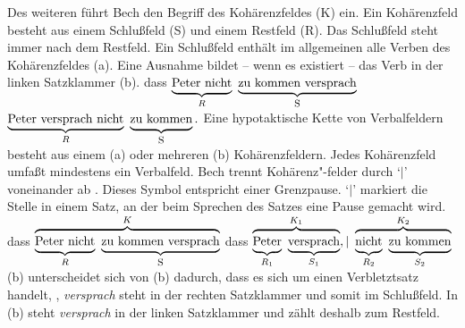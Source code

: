 Des weiteren führt Bech den Begriff des Kohärenzfeldes (K) ein.%
Ein Kohärenzfeld besteht aus einem Schlußfeld (S) und einem Restfeld (R).%
%
%
%
Das Schlußfeld steht immer nach dem Restfeld. Ein Schlußfeld enthält im allgemeinen
alle Verben des Kohärenzfeldes (a). Eine Ausnahme bildet -- wenn es existiert --
das Verb in der linken Satzklammer (b).
\eal
\ex dass ${\underbrace{\rule[-0.5ex]{0cm}{2.5ex}\mbox{Peter nicht}
                              }_{R}~
                   \underbrace{\mbox{zu kommen versprach}
                              }_{\mbox{\footnotesize S}}}$
\ex ${ \underbrace{\mbox{Peter versprach nicht}
                        }_{R}~
             \underbrace{\rule[-0.5ex]{0cm}{2.5ex}\mbox{zu kommen}
                        }_{\mbox{\footnotesize S}}.}$
\zl
Eine hypotaktische Kette von Verbalfeldern besteht aus einem (a) oder mehreren
(b) Kohärenzfeldern. Jedes Kohärenzfeld umfaßt mindestens ein Verbalfeld. Bech trennt
Kohä\-renz"-felder durch `$|$'\is{$\vert$} voneinander ab \citep[\S 77]{Bech55a}. 
%
%
Dieses Symbol entspricht einer Grenzpause.
`$|$' markiert die Stelle in einem Satz, an der beim Sprechen des Satzes 
eine Pause gemacht wird.
\eal
\ex dass ${\overbrace{\underbrace{\rule[-0.5ex]{0cm}{2.5ex}{\textrm{Peter~nicht}}
                                         }_{R}~
                   \underbrace{\textrm{zu~kommen~versprach}}_{\mbox{\footnotesize S}}}^{K}}$
%
\ex dass ${\overbrace{\underbrace{\rule[-0.5ex]{0cm}{2.5ex}{\textrm{Peter}}
                                         }_{R_1}~
                              \underbrace{\textrm{versprach}}_{S_1}
                             }^{K_1}, |~
                   \overbrace{\underbrace{\rule[-0.5ex]{0cm}{2.5ex}{\textrm{nicht}}
                                         }_{R_2}~
                              \underbrace{\rule[-0.5ex]{0cm}{2.5ex}{\textrm{zu~kommen}}
                                         }_{S_2}
                             }^{K_2}}$
\zl
(b) unterscheidet sich von (b) dadurch, dass es sich um
einen Verbletztsatz handelt, \dash, \emph{versprach} steht in der rechten Satzklammer und somit im
Schlußfeld. In (b) steht \emph{versprach} in der linken Satzklammer und zählt deshalb zum
Restfeld. 

